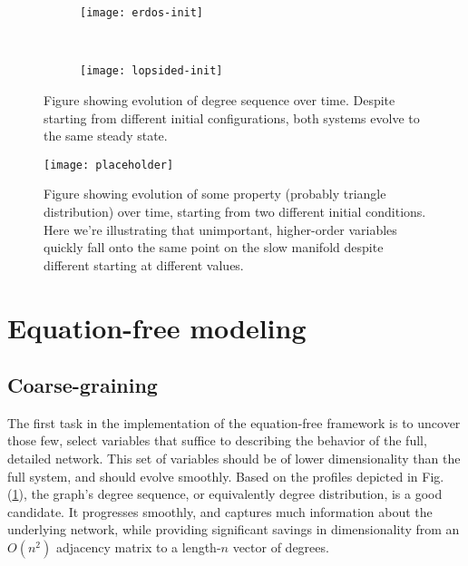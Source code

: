 \documentclass[12pt]{article}
\begin{document}
\begin{onehalfspace}
\begin{figure}[h!]
  \vspace{-5mm}
  \centering
  \begin{subfigure}{0.75\textwidth}
    \centering
    \texttt{[image: erdos-init]}
  \end{subfigure} \\ %
  \begin{subfigure}{0.75\textwidth}
    \centering
    \texttt{[image: lopsided-init]}
  \end{subfigure}%
  \caption{Figure showing evolution of degree sequence over time. Despite starting from different initial configurations, both systems evolve to the same steady state. \label{fig:dse}}
\end{figure}


\begin{figure}[ht!]
  \centering
  \texttt{[image: placeholder]}
  \caption{Figure showing evolution of some property (probably triangle distribution) over time, starting from two different initial conditions. Here we're illustrating that unimportant, higher-order variables quickly fall onto the same point on the slow manifold despite different starting at different values. \label{fig:sv}}
\end{figure}

\section{Equation-free modeling}
\label{sec:ef}

\subsection{Coarse-graining}

The first task in the implementation of the equation-free framework is to uncover those few, select variables that suffice to describing the behavior of the full, detailed network. This set of variables should be of lower dimensionality than the full system, and should evolve smoothly. Based on the profiles depicted in Fig. (\ref{fig:dse}), the graph's degree sequence, or equivalently degree distribution, is a good candidate. It progresses smoothly, and captures much information about the underlying network, while providing significant savings in dimensionality from an $O(n^2)$ adjacency matrix to a length-$n$ vector of degrees. \par


\end{onehalfspace}
\end{document}
